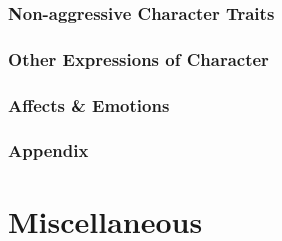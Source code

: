 \documentclass{article}
\begin{document}
\subsubsection{Non-aggressive Character Traits}

\subsubsection{Other Expressions of Character}

\subsubsection{Affects \& Emotions}

\subsubsection{Appendix}


\section{Miscellaneous}


\printbibliography[heading=bibintoc]
	
\end{document}

